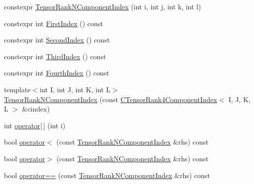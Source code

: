 \begin{DoxyCompactItemize}
\item 
constexpr \mbox{\hyperlink{classmpc_1_1core_1_1_tensor_rank_n_component_index_3_014_01_4_ad0409ae149b77534b6ebe8c5c505da34}{Tensor\+Rank\+N\+Component\+Index}} (int i, int j, int k, int l)
\item 
constexpr int \mbox{\hyperlink{classmpc_1_1core_1_1_tensor_rank_n_component_index_3_014_01_4_aa53ef8e043e70e3473b94cc3ecfea711}{First\+Index}} () const
\item 
constexpr int \mbox{\hyperlink{classmpc_1_1core_1_1_tensor_rank_n_component_index_3_014_01_4_a19f98ad2f36bc3b628a2e62aa7c694d5}{Second\+Index}} () const
\item 
constexpr int \mbox{\hyperlink{classmpc_1_1core_1_1_tensor_rank_n_component_index_3_014_01_4_ab6e0fb58d5cdb85ea6fd93ff8e9c5ea0}{Third\+Index}} () const
\item 
constexpr int \mbox{\hyperlink{classmpc_1_1core_1_1_tensor_rank_n_component_index_3_014_01_4_a09fc406e0b7574a7904aa846630623bc}{Fourth\+Index}} () const
\item 
{\footnotesize template$<$int I, int J, int K, int L$>$ }\\\mbox{\hyperlink{classmpc_1_1core_1_1_tensor_rank_n_component_index_3_014_01_4_adf1c84d14be60121eb9774a015e9cb5d}{Tensor\+Rank\+N\+Component\+Index}} (const \mbox{\hyperlink{classmpc_1_1core_1_1_c_tensor_rank4_component_index}{C\+Tensor\+Rank4\+Component\+Index}}$<$ I, J, K, L $>$ \&cindex)
\item 
int \mbox{\hyperlink{classmpc_1_1core_1_1_tensor_rank_n_component_index_3_014_01_4_aa36aaef65c9dba82a037d09c55f9b89e}{operator\mbox{[}$\,$\mbox{]}}} (int i)
\item 
bool \mbox{\hyperlink{classmpc_1_1core_1_1_tensor_rank_n_component_index_3_014_01_4_ab7900b113b5c24f52e524a04121d9a0e}{operator$<$}} (const \mbox{\hyperlink{classmpc_1_1core_1_1_tensor_rank_n_component_index}{Tensor\+Rank\+N\+Component\+Index}} \&rhs) const
\item 
bool \mbox{\hyperlink{classmpc_1_1core_1_1_tensor_rank_n_component_index_3_014_01_4_ab150acacce0779a041b8d40e484bc734}{operator$>$}} (const \mbox{\hyperlink{classmpc_1_1core_1_1_tensor_rank_n_component_index}{Tensor\+Rank\+N\+Component\+Index}} \&rhs) const
\item 
bool \mbox{\hyperlink{classmpc_1_1core_1_1_tensor_rank_n_component_index_3_014_01_4_a0f011e4894f2c385c30c64fcba648d0d}{operator==}} (const \mbox{\hyperlink{classmpc_1_1core_1_1_tensor_rank_n_component_index}{Tensor\+Rank\+N\+Component\+Index}} \&rhs) const

\end{DoxyCompactItemize}
